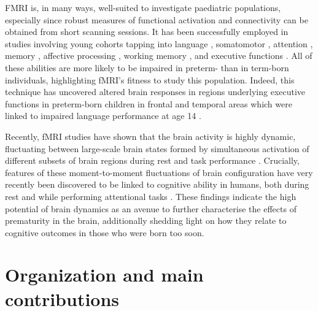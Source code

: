 FMRI is, in many ways, well-suited to investigate paediatric populations, especially since robust measures of functional activation and connectivity can be obtained from short scanning sessions. It has been successfully employed in studies involving young cohorts tapping into language \citep{Centeno2014, Pigdon2020}, somatomotor \citep{Zwicker2011, Sgandurra2018}, attention \citep{Somandepalli2015, Jiang2019, Harrewijn2020}, memory \citep{Mankinen2015, DeBie2015}, affective processing \citep{Loveland2008, McRae2012}, working memory \citep{Siffredi2017, Yaple2018}, and executive functions \citep{Wang2013, Staphorsius2015}. All of these abilities are more likely to be impaired in preterm- than in term-born individuals, highlighting fMRI's fitness to study this population. Indeed, this technique has uncovered altered brain responses in regions underlying executive functions in preterm-born children in frontal \citep{Reveillon2013,Murner-Lavanchy2014} and temporal areas \citep{Kwon2014a, Wilke2014} which were linked to impaired language performance at age 14 \citep{Wilke2014}.
  
Recently, fMRI studies have shown that the brain activity is highly dynamic, fluctuating between large-scale brain states formed by simultaneous activation of different subsets of brain regions during rest \citep{Chang2010, Preti2017, Liu2018} and task performance \citep{Di2015, Cheng2018}. Crucially, features of these moment-to-moment fluctuations of brain configuration have very recently been discovered to be linked to cognitive ability in humans, both during rest \cite{Chen2019} and while performing attentional tasks \cite{Fong2019}. These findings indicate the high potential of brain dynamics as an avenue to further characterise the effects of prematurity in the brain, additionally shedding light on how they relate to cognitive outcomes in those who were born too soon. 
 


\section{Organization and main contributions}


